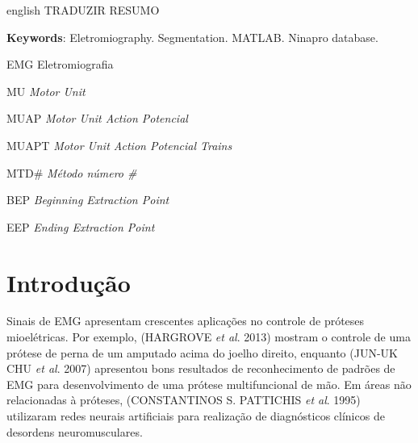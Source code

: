 \documentclass[
	12pt,				%
	openright,			%
	oneside,			%
	a4paper,			%
	english,			%
	francais,			%
	spanish,			%
	brazil				%
	]{abntex2}
\begin{document}
\begin{resumo}[Abstract]
 \begin{otherlanguage*}{english}
	TRADUZIR RESUMO
	
   \vspace{\onelineskip}
   \noindent 
   \textbf{Keywords}: Eletromiography. Segmentation. MATLAB. Ninapro database.
 \end{otherlanguage*}
\end{resumo}

\listoffigures*
\cleardoublepage

\listoftables*
\cleardoublepage

\begin{siglas}
  	\item[EMG]		Eletromiografia
	\item[MU]		\emph{Motor Unit}
  	\item[MUAP]		\emph{Motor Unit Action Potencial}
	\item[MUAPT]	\emph{Motor Unit Action Potencial Trains}
	\item[MTD\#]	\emph{Método número \#}
	\item[BEP]		\emph{Beginning Extraction Point}
	\item[EEP]		\emph{Ending Extraction Point}
\end{siglas}

\tableofcontents*
\cleardoublepage



\textual

\chapter{Introdução}

Sinais de EMG apresentam crescentes aplicações no controle de próteses mioelétricas. Por exemplo, (HARGROVE \emph{et al}. 2013) mostram o controle de uma prótese de perna de um amputado acima do joelho direito, enquanto (JUN-UK CHU \emph{et al}. 2007) apresentou bons resultados de reconhecimento de padrões de EMG para desenvolvimento de uma prótese multifuncional de mão. Em áreas não relacionadas à próteses, (CONSTANTINOS S. PATTICHIS \emph{et al}. 1995) utilizaram redes neurais artificiais para realização de diagnósticos clínicos de desordens neuromusculares.
\end{document}
